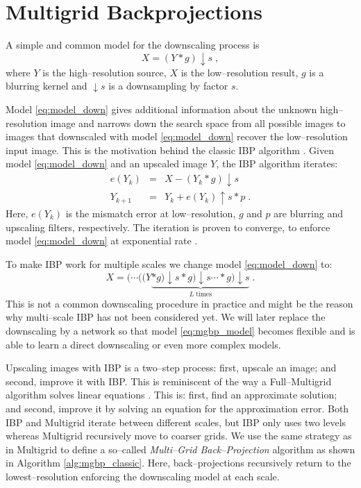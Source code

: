 \documentclass[letterpaper]{article}
\begin{document}
\section{Multigrid Backprojections}
\label{sec:MGBP}
A simple and common model for the downscaling process is
\begin{equation}
    X = (Y*g)\downarrow s \;, \label{eq:model_down}
\end{equation}
where $Y$ is the high--resolution source, $X$ is the low--resolution result, $g$ is a blurring kernel and $\downarrow s$ is a downsampling by factor $s$.

Model \eqref{eq:model_down} gives additional information about the unknown high--resolution image and narrows down the search space from all possible images to images that downscaled with model \eqref{eq:model_down} recover the low--resolution input image. This is the motivation behind the classic IBP algorithm \cite{Irani_1991a}. Given model \eqref{eq:model_down} and an upscaled image $Y$, the IBP algorithm iterates:
\begin{eqnarray}
    e(Y_k) & = & X-(Y_k*g)\downarrow s \\
    Y_{k+1} & = & Y_k+e(Y_k)\uparrow s * p \;.
\end{eqnarray}
Here, $e(Y_k)$ is the mismatch error at low--resolution, $g$ and $p$ are blurring and upscaling filters, respectively. The iteration is proven to converge, to enforce model \eqref{eq:model_down} at exponential rate \cite{Irani_1991a}.

To make IBP work for multiple scales we change model \eqref{eq:model_down} to:
\begin{equation}
    X = (\cdots ((Y \underbrace{* g)\downarrow s * g)\downarrow s \cdots *g)\downarrow s}_{L \; \text{times}} \;. \label{eq:mgbp_model}
\end{equation}
This is not a common downscaling procedure in practice and might be the reason why multi--scale IBP has not been considered yet. We will later replace the downscaling by a network so that model \eqref{eq:mgbp_model} becomes flexible and is able to learn a direct downscaling or even more complex models.

Upscaling images with IBP is a two--step process: first, upscale an image; and second, improve it with IBP. This is reminiscent of the way a Full--Multigrid algorithm solves linear equations \cite{UTrottenberg_2000a}. This is: first, find an approximate solution; and second, improve it by solving an equation for the approximation error. Both IBP and Multigrid iterate between different scales, but IBP only uses two levels whereas Multigrid recursively move to coarser grids. We use the same strategy as in Multigrid to define a so--called \emph{Multi--Grid Back--Projection} algorithm as shown in Algorithm \ref{alg:mgbp_classic}.
Here, back--projections recursively return to the lowest--resolution enforcing the downscaling model at each scale.
\end{document}
